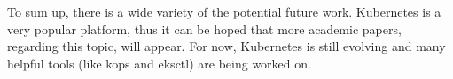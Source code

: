 To sum up, there is a wide variety of the potential future work. Kubernetes is a very popular platform, thus it can be hoped that more academic papers, regarding this topic, will appear. For now, Kubernetes is still evolving and many helpful tools (like kops and eksctl) are being worked on.

